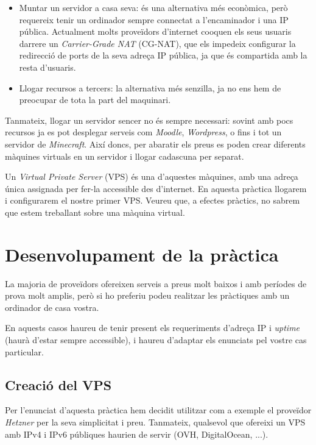 \documentclass{practicaitic}
\begin{document}
\begin{itemize}
  \item Muntar un servidor a casa seva: és una alternativa més econòmica, però
  requereix tenir un ordinador sempre connectat a l'encaminador i una IP pública.
  Actualment molts proveïdors d'internet co\lgem oquen els seus usuaris darrere un
  \textit{Carrier-Grade NAT} (CG-NAT), que els impedeix configurar la
  redirecció de ports de la seva adreça IP pública, ja que és compartida amb la
  resta d'usuaris.
  \item Llogar recursos a tercers: la alternativa més senzilla, ja no ens hem
  de preocupar de tota la part del maquinari.
\end{itemize}

Tanmateix, llogar un servidor sencer no és sempre necessari: sovint amb pocs
recursos ja es pot desplegar serveis com \textit{Moodle}, \textit{Wordpress},
o fins i tot un servidor de \textit{Minecraft}.
Així doncs, per abaratir els preus es poden crear diferents màquines virtuals
en un servidor i llogar cadascuna per separat.

Un \textit{Virtual Private Server} (VPS) és una d'aquestes màquines, amb una
adreça única assignada per fer-la accessible des d'internet. En aquesta
pràctica llogarem i configurarem el nostre primer VPS. Veureu que, a efectes pràctics,
no sabrem que estem treballant sobre una màquina virtual.

\section{Desenvolupament de la pràctica}

La majoria de proveïdors
ofereixen serveis a preus molt baixos i amb períodes de prova molt amplis, però
si ho preferiu podeu realitzar les pràctiques amb un ordinador de casa vostra.

En aquests casos haureu de tenir present els requeriments d'adreça IP i
\textit{uptime} (haurà d'estar sempre accessible), i haureu d'adaptar els
enunciats pel vostre cas particular.

\subsection{Creació del VPS}

Per l'enunciat d'aquesta pràctica hem decidit utilitzar com a exemple el
proveïdor \textit{Hetzner} per la seva simplicitat i preu. Tanmateix,
qualsevol que ofereixi un VPS amb IPv4 i
IPv6 públiques haurien de servir (OVH, DigitalOcean, ...).
\end{document}
